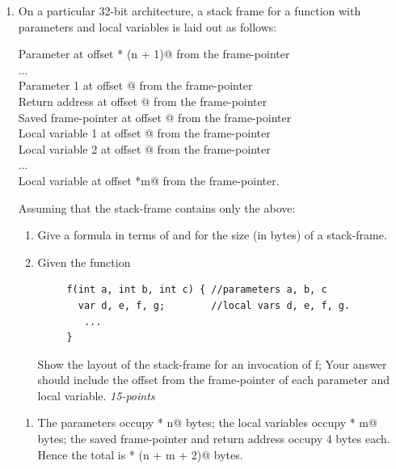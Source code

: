 \documentclass[12pt]{article}
\begin{document}
\begin{enumerate}

\item On a particular 32-bit architecture, a stack frame for a
  function with \verb@n@ parameters and \verb@m@ local variables is laid
  out as follows:

  Parameter \verb@n@ at offset  * (n + 1)@ from the frame-pointer\\
  ...\\
  Parameter 1 at offset @ from the frame-pointer\\
  Return address at offset @ from the frame-pointer\\
  Saved frame-pointer at offset @ from the frame-pointer\\
  Local variable 1 at offset @ from the frame-pointer\\
  Local variable 2 at offset @ from the frame-pointer\\
  ...\\
  Local variable \verb@m@ at offset *m@ from the frame-pointer.

  Assuming that the stack-frame contains only the above:

  \begin{enumerate}
  \item Give a formula in terms of \verb@n@ and \verb@m@ for the size
    (in bytes) of a stack-frame.

  \item Given the function

\begin{verbatim}
     f(int a, int b, int c) { //parameters a, b, c
       var d, e, f, g;        //local vars d, e, f, g.
        ...
     }
  \end{verbatim}
     Show the layout of the stack-frame for an invocation of f; Your
 answer should include the offset from the frame-pointer of each parameter
and local variable. \hfill{\textit{15-points}}


    \end{enumerate}

\begin{enumerate}

\item The \verb@n@ parameters occupy  * n@ bytes; the \verb@m@
 local variables occupy  * m@ bytes; the saved frame-pointer
 and return address occupy 4 bytes each.  Hence the total is
  * (n + m + 2)@ bytes.


\end{enumerate}
\end{enumerate}
\end{document}
